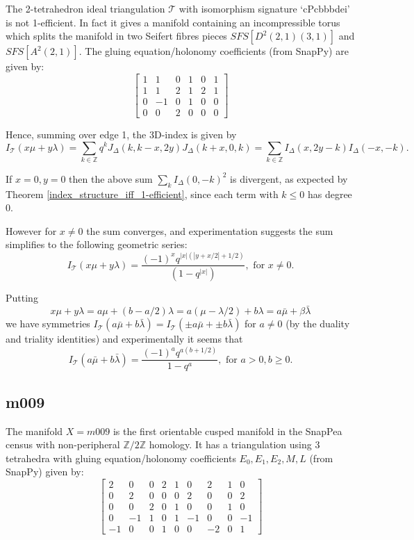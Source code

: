 \documentclass[12pt,reqno]{amsart}  %
\theoremstyle{definition}
\theoremstyle{remark}
\def\b{\beta}
\def\ID{I_{\Delta}}
\newcommand{\T}{\mathcal{T}}
\def\Z{\mathbb Z}
\def\JD{J_{\Delta}}
\begin{document}
The 2-tetrahedron ideal triangulation $\T$ with isomorphism signature
`cPcbbbdei' is not 1-efficient.  In fact it gives a manifold containing an 
incompressible torus which splits the manifold in 
two Seifert fibres pieces $SFS[D^2(2,1)(3,1)]$ and $SFS[A^2(2,1)]$. The 
gluing equation/holonomy coefficients (from SnapPy) are given by:
$$
\begin{bmatrix} 1 & 1 & 0 & 1 & 0 & 1 \\ 1 & 1 & 2 & 1&2&1\\
0 & -1 & 0 & 1 & 0 & 0\\ 0 & 0 & 2 & 0 & 0& 0
\end{bmatrix}
$$

Hence, summing over edge 1,  the 3D-index is given by
$$
I_\T(x \mu + y\lambda ) =\sum_{k \in \Z} q^k \JD(k,k-x,2y) \JD(k+x,0,k)
= \sum_{k \in \Z} \ID(x,2y-k) \ID(-x,-k).
$$

If $x=0,y=0$ then the above sum $\sum_k \ID(0,-k)^2$ 
is divergent, as expected by Theorem \ref{index_structure_iff_1-efficient}, 
since each term with $k \le 0$ has degree $0$.

However for $x \ne 0$ the sum converges, and experimentation suggests the sum 
simplifies to the following geometric series:
$$
I_\T(x \mu + y \lambda) = \frac{ (-1)^x q^{|x|(|y + x/2| + 1/2)}}{(1 - q^{|x|})}, 
\text{ for } x\ne 0.
$$

Putting 
$$
x \mu + y \lambda = a \mu +(b-a/2)\lambda = a(\mu-\lambda/2)+b\lambda =
a \bar \mu + \b \bar \lambda
$$
we have symmetries
$I_\T(a \bar \mu + b \bar\lambda) = 
I_\T( \pm a \bar \mu + \pm b \bar\lambda)$ for $a \ne 0$ 
(by the duality and triality identities) and experimentally it seems that
$$
I_\T(a \bar \mu + b \bar\lambda) = \frac{(-1)^a q^{a(b+1/2)}} {1-q^a},  
\text{ for }a>0, b \ge 0.
$$

\subsection{m009}

The manifold $X=m009$ is the first orientable cusped manifold in the 
SnapPea census with non-peripheral $\Z/2\Z$ homology. It has a 
triangulation using 3 tetrahedra with
gluing equation/holonomy coefficients $E_0,E_1,E_2,M,L$ (from SnapPy) 
given by:
$$
\begin{bmatrix} 
2 & 0 & 0 & 2 & 1 & 0 & 2 & 1 & 0\\
0 & 2 & 0 & 0 & 0 & 2 &  0 & 0 & 2\\
0 & 0 & 2 & 0 & 1 & 0 & 0 & 1 & 0\\
0 & -1& 1 & 0 & 1 & -1& 0 & 0 & -1\\
-1 & 0 & 0 & 1 & 0 & 0 & -2 & 0 & 1
\end{bmatrix}
$$
\end{document}
